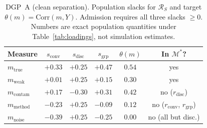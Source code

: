 \documentclass[10pt,letterpaper]{article}
\newcommand{\M}{\ensuremath{\mathcal{M}}}
\newcommand{\Rset}{\mathcal{R}}
\begin{document}
\begin{table}[t]
\centering
\small
\caption{DGP~A (clean separation).
Population slacks for $\Rset_S$ and target $\theta(m)=\mathrm{Corr}(m,Y)$.
Admission requires all three slacks $\ge 0$.
Numbers are exact population quantities under Table~\ref{tab:loadings}, not simulation estimates.}
\label{tab:dgpa}
\begin{tabular}{@{}lccccc@{}}
\toprule
Measure & $s_{\mathrm{conv}}$ & $s_{\mathrm{disc}}$ & $s_{\mathrm{grp}}$ & $\theta(m)$ & In $\M^*$? \\
\midrule
$m_{\mathrm{true}}$   & $+0.33$ & $+0.25$ & $+0.47$ & $0.54$ & yes \\
$m_{\mathrm{weak}}$   & $+0.01$ & $+0.25$ & $+0.15$ & $0.30$ & yes \\
$m_{\mathrm{contam}}$ & $+0.17$ & $-0.30$ & $+0.31$ & $0.42$ & no ($r_{\mathrm{disc}}$) \\
$m_{\mathrm{method}}$ & $-0.23$ & $+0.25$ & $-0.09$ & $0.12$ & no ($r_{\mathrm{conv}}$, $r_{\mathrm{grp}}$) \\
$m_{\mathrm{noise}}$  & $-0.39$ & $+0.25$ & $-0.25$ & $0.00$ & no (all but disc.) \\
\bottomrule
\end{tabular}
\end{table}
\end{document}

